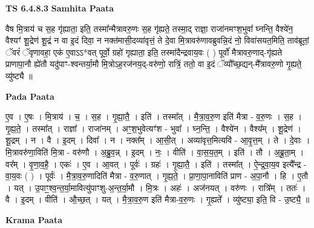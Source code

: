 \documentclass[17pt]{extarticle}
\begin{document}
\textbf{TS 6.4.8.3 } \newline
\textbf{Samhita Paata} \newline

वैष मि॒त्राय॑ च स॒ह गृ॑ह्याता॒ इति॒ तस्मा᳚न्मैत्रावरु॒णः स॒ह गृ॑ह्यते॒ तस्मा॒द् राज्ञा॒ राजा॑नमꣳश॒भुवा᳚ घ्नन्ति॒ वैश्ये॑न॒ वैश्यꣳ॑ शू॒द्रेण॑ शू॒द्रं न वा इ॒दं दिवा॒ न नक्त॑मासी॒दव्या॑वृत्तं॒ ते दे॒वा मि॒त्रावरु॑णावब्रुवन्नि॒दं नो॒ विवा॑सयत॒मिति॒ ताव॑ब्रूतां॒ ॅवरं॑ ॅवृणावहा॒ एक॑ ए॒वाऽऽ*वत् पूर्वो॒ ग्रहो॑ गृह्याता॒ इति॒ तस्मा॑दैन्द्रवाय॒वः ( ) पूर्वो॑ मैत्रावरु॒णाद्-गृ॑ह्यते प्राणापा॒नौ ह्ये॑तौ यदु॑पाꣳ-श्वन्तर्या॒मौ मि॒त्रोऽह॒रज॑नय॒द्-वरु॑णो॒ रात्रिं॒ ततो॒ वा इ॒दं ॅव्यौ᳚च्छ॒द्यन्-मै᳚त्रावरु॒णो गृ॒ह्यते॒ व्यु॑ष्ट्यै ॥ \newline

\textbf{Pada Paata} \newline

ए॒व । ए॒षः । मि॒त्राय॑ । च॒ । स॒ह । गृ॒ह्या॒तै॒ । इति॑ । तस्मा᳚त् । मै॒त्रा॒व॒रु॒ण इति॑ मैत्रा - व॒रु॒णः । स॒ह । गृ॒ह्य॒ते॒ । तस्मा᳚त् । राज्ञा᳚ । राजा॑नम् । अꣳ॒॒श॒भुवेत्यꣳ॑श - भुवा᳚ । घ्न॒न्ति॒ । वैश्ये॑न । वैश्य᳚म् । शू॒द्रेण॑ । शू॒द्रम् । न । वै । इ॒दम् । दिवा᳚ । न । नक्त᳚म् । आ॒सी॒त् । अव्या॑वृत्त॒मित्यवि॑ - आ॒वृ॒त्त॒म् । ते । दे॒वाः । मि॒त्रावरु॑णा॒विति॑ मि॒त्रा - वरु॑णौ । अ॒ब्रु॒व॒न्न् । इ॒दम् । नः॒ । वीति॑ । वा॒स॒य॒त॒म् । इति॑ । तौ । अ॒ब्रू॒ता॒म् । वर᳚म् । वृ॒णा॒व॒है॒ । एकः॑ । ए॒व । आ॒वत् । पूर्वः॑ । ग्रहः॑ । गृ॒ह्या॒तै॒ । इति॑ । तस्मा᳚त् । ऐ॒न्द्र॒वा॒य॒व इत्यै᳚न्द्र - वा॒य॒वः ( ) । पूर्वः॑ । मै॒त्रा॒व॒रु॒णादिति॑ मैत्रा - व॒रु॒णात् । गृ॒ह्य॒ते॒ । प्रा॒णा॒पा॒नाविति॑ प्राण - अ॒पा॒नौ । हि । ए॒तौ । यत् । उ॒पाꣳ॒॒श्व॒न्त॒र्या॒मावित्यु॑पाꣳशु-अ॒न्त॒र्या॒मौ । मि॒त्रः । अहः॑ । अज॑नयत् । वरु॑णः । रात्रि᳚म् । ततः॑ । वै । इ॒दम् । वीति॑ । औ॒च्छ॒त् । यत् । मै॒त्रा॒व॒रु॒ण इति॑ मैत्रा-व॒रु॒णः । गृ॒ह्यते᳚ । व्यु॑ष्ट्या॒ इति॒ वि - उ॒ष्ट्यै॒ ॥  \newline


\textbf{Krama Paata} \newline
\end{document}
